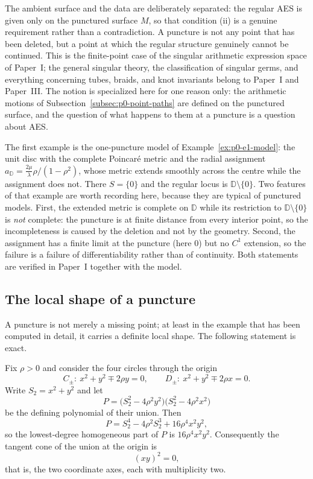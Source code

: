 The ambient surface and the data are deliberately separated: the regular AES is
given only on the punctured surface $M$, so that condition (ii) is a genuine
requirement rather than a contradiction.  A puncture is not any point that has
been deleted, but a point at which the regular structure genuinely cannot be
continued.  This is the finite-point case of the singular arithmetic expression
space of Paper~I; the general singular theory, the classification of singular
germs, and everything concerning tubes, braids, and knot invariants belong to
Paper~I and Paper~III.  The notion is specialized here for one reason only: the
arithmetic motions of Subsection~\ref{subsec:p0-point-paths} are defined on the
punctured surface, and the question of what happens to them at a puncture is a
question about AES.

The first example is the one-puncture model of Example~\ref{ex:p0-e1-model}: the
unit disc with the complete Poincar\'e metric and the radial assignment
$a_{\mathbb D}=\frac{2\mu}{\lambda}\rho/(1-\rho^2)$, whose metric extends
smoothly across the centre while the assignment does not.  There $S=\{0\}$ and
the regular locus is $\mathbb D\setminus\{0\}$.  Two features of that example
are worth recording here, because they are typical of punctured models.  First,
the extended metric is complete on $\mathbb D$ while its restriction to
$\mathbb D\setminus\{0\}$ is \emph{not} complete: the puncture is at finite
distance from every interior point, so the incompleteness is caused by the
deletion and not by the geometry.  Second, the assignment has a finite limit at
the puncture (here $0$) but no $C^1$ extension, so the failure is a failure of
differentiability rather than of continuity.  Both statements are verified in
Paper~I together with the model.

\subsection{The local shape of a puncture}
\label{subsec:p0-holed-tangent-cone}

A puncture is not merely a missing point; at least in the example that has been
computed in detail, it carries a definite local shape.  The following statement
is exact.

\begin{proposition}
\label{prop:p0-puncture-tangent-cone}
Fix $\rho>0$ and consider the four circles through the origin
\[
  C_\pm:\ x^2+y^2\mp2\rho y=0,
  \qquad
  D_\pm:\ x^2+y^2\mp2\rho x=0 .
\]
Write $S_2=x^2+y^2$ and let
\[
  P=\bigl(S_2^2-4\rho^2y^2\bigr)\bigl(S_2^2-4\rho^2x^2\bigr)
\]
be the defining polynomial of their union.  Then
\[
  P=S_2^4-4\rho^2S_2^3+16\rho^4x^2y^2 ,
\]
so the lowest-degree homogeneous part of $P$ is $16\rho^4x^2y^2$.  Consequently
the tangent cone of the union at the origin is
\[
  (xy)^2=0 ,
\]
that is, the two coordinate axes, each with multiplicity two.
\end{proposition}

